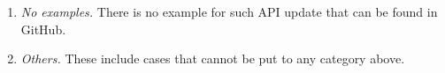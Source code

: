 \begin{enumerate}
\begin{itemize}
\end{itemize}

\item {\em No examples.} There is no example for such API update that can be found in GitHub. 

\item {\em Others.} These include cases that cannot be put to any category above.
\end{enumerate}
